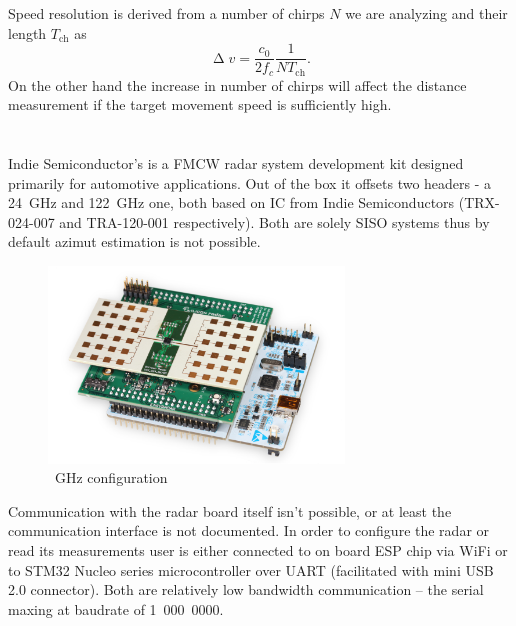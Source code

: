 Speed resolution is derived from a number of chirps $N$ we are analyzing and their length $T_{\mathrm{ch}}$ as
\begin{equation}
	\upDelta v = \frac{c_0}{2f_c} \frac{1}{NT_{\mathrm{ch}}}.
	\label{eq:doppler3}
\end{equation}
On the other hand the increase in number of chirps will affect the distance measurement if the target movement speed is sufficiently high.



\chapter{\sidar}

Indie Semiconductor's \sidar is a FMCW radar system development kit designed primarily for automotive applications.
Out of the box it offsets two headers - a 24~GHz and 122~GHz one, both based on IC from Indie Semiconductors (TRX-024-007 and TRA-120-001 respectively).
Both are solely SISO systems thus by default azimut estimation is not possible.

\begin{figure}[h!]
	\centering
	\includegraphics[width=0.7\textwidth]{../img/sidar.png}

	\caption[\sidar \cite{sidarMANOld}]{~GHz configuration}
	\label{fig:sidar}
\end{figure}

Communication with the radar board itself isn't possible, or at least  the communication interface is not documented.
In order to configure the radar or read its measurements user is either connected to on board ESP chip via WiFi or to STM32 Nucleo series microcontroller over UART (facilitated with mini USB 2.0 connector).
Both are relatively low bandwidth communication -- the serial maxing at baudrate of 1~000~0000.

